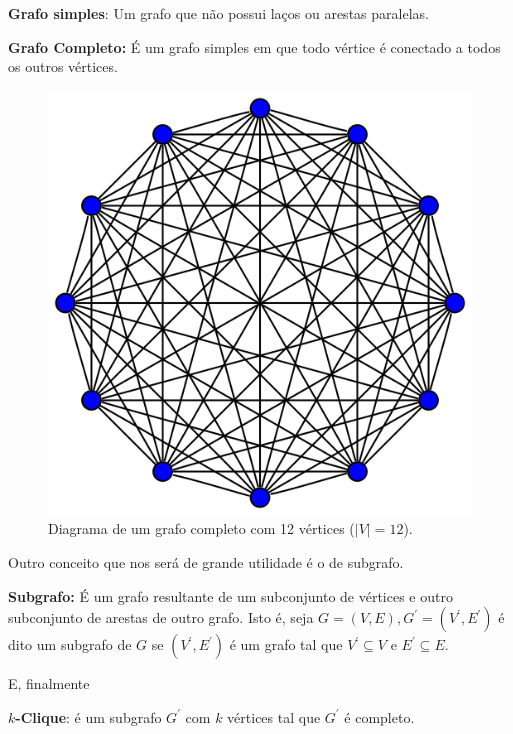 \documentclass[a4paper,12pt]{article}
\begin{document}
\begin{center}
	\begin{minipage}{0.9 \linewidth}
		\textbf{Grafo simples}: Um grafo que não possui laços ou arestas paralelas.
	\end{minipage}
\end{center}

\begin{center}
	\begin{minipage}{0.9 \linewidth}
		\textbf{Grafo Completo:} É um grafo simples em que todo vértice é conectado a todos os outros vértices.
	\end{minipage}
\end{center}

\begin{figure}[H]
	\begin{center}
		\includegraphics[width=0.4\linewidth]{grafocompleto.png}
	\end{center}
	\caption{Diagrama de um grafo completo com 12 vértices ($|V| = 12$).}
	\label{fig:grafocompleto}
\end{figure}

Outro conceito que nos será de grande utilidade é o de subgrafo.
\begin{center}
	\begin{minipage}{0.9 \linewidth}
		\textbf{Subgrafo:} É um grafo resultante de um subconjunto de vértices e outro subconjunto de arestas de outro grafo. Isto é, seja $G = (V, E), G^\prime = (V^\prime, E^\prime)$ é dito um subgrafo de $G$ se $(V^\prime, E^\prime)$ é um grafo tal que $V^\prime \subseteq V$ e $E^\prime \subseteq E$.
	\end{minipage}
\end{center}

E, finalmente
\begin{center}
	\begin{minipage}{0.9 \linewidth}
		\textbf{$k$-Clique}: é um subgrafo $G^\prime$ com $k$ vértices tal que $G^\prime$ é completo.
	\end{minipage}
\end{center}
\end{document}
